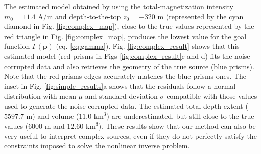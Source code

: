 The estimated model obtained by using the total-magnetization intensity $ m_0 = 11.4 $ A/m and depth-to-the-top $ z_0 = -320 $ m (represented by the cyan diamond in Fig. \ref{fig:complex_map}), close to the true values represented by the red
triangle in Fig. \ref{fig:complex_map}, produces the lowest value for the goal function 
$ \Gamma(\mathbf{p}) $ (eq. \ref{eq:gamma}). Fig. \ref{fig:complex_result} shows that this estimated model (red prisms in Figs \ref{fig:complex_result}c and d) fits the noise-corrupted data and also retrieves the geometry of the true source (blue prisms). 
Note that the red prisms edges accurately matches the blue prisms ones. 
The inset in Fig. \ref{fig:simple_results}a shows that the residuals follow a normal 
distribution with mean $ \mu $ and standard deviation $ \sigma $ compatible with those 
values used to generate the noise-corrupted data. 
The estimated total depth extent ($ 5597.7 $ m) and volume ($ 11.0 $ km$^3 $) are underestimated, but still close to the true values ($ 6000 $ m and $ 12.60 $ km$^3 $). 
These results show that our method can also be very useful to interpret complex sources, even if they do not perfectly satisfy the constraints imposed to solve the nonlinear inverse problem.